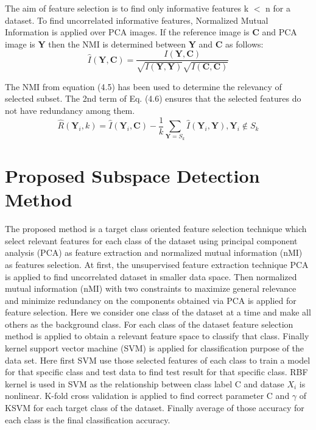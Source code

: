 \documentclass[document.tex]{subfiles}
\begin{document}
\noindent The aim of feature selection is to find only informative features
k $<$ n for a dataset. To find uncorrelated informative features, Normalized
Mutual Information is applied over PCA images. If the reference image is \textbf{C} and PCA image is \textbf{Y} then the NMI is determined between \textbf{Y} and \textbf{C} as follows:
\begin{equation}
\hat{I}(\textbf{Y},\textbf{C}) = \dfrac{I(\textbf{Y}, \textbf{C})}{\sqrt{I(\textbf{Y},\textbf{Y})}\sqrt{I( \textbf{C}, \textbf{C})}}
\end{equation}

\noindent The NMI from equation (4.5) has been used to determine the relevancy of selected subset. The 2nd term of Eq. (4.6) ensures that the selected features do not have redundancy among them. 
\begin{equation}
\hat{R}(\textbf{Y}_i,k) = \hat{I}(\textbf{Y}_i,\textbf{C}) - \dfrac{1}{k} \sum_{\textbf{Y} = S_k} \hat{I}(\textbf{Y}_i,\textbf{Y}),  \textbf{Y}_i\notin S_k
\end{equation}

\section{Proposed Subspace Detection Method}
\noindent The proposed method is a target class oriented feature selection technique which select relevant features for each class of the dataset using principal component analysis (PCA) as feature extraction\cite{7} and normalized mutual information (nMI) as features selection\cite{9}. At first, the unsupervised feature extraction technique PCA is applied to find uncorrelated dataset in smaller data space. Then normalized mutual information (nMI) with two constraints to maximize general relevance and minimize redundancy on the components obtained via PCA is applied for feature selection\cite{21}. Here we consider one class of the dataset at a time and make all others as the background class. For each class of the dataset feature selection method is applied to obtain a relevant feature space to classify that class. Finally kernel support vector machine (SVM) is applied for classification purpose of the data set\cite{11}. Here first SVM use those selected features of each class to train a model for that specific class and test data to find test result for that specific class. RBF kernel\cite{22} is used in SVM as the relationship between class label C and datase $X_i$ is nonlinear. K-fold cross validation is applied to find correct parameter C and $\gamma$ of KSVM for each target class of the dataset. Finally average of those accuracy for each class is the final classification accuracy.
\end{document}
